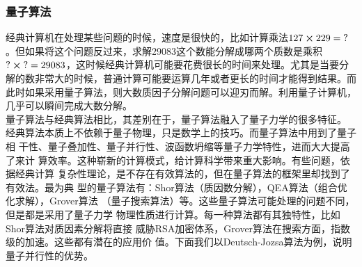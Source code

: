 \documentclass[a4paper]{article}
\begin{document}
\subsubsection{量子算法}
经典计算机在处理某些问题的时候，速度是很快的，比如计算乘法$ 127\cross 229 = \text{?} $。但如果将这个问题反过来，求解29083这个数能分解成哪两个质数是乘积$ \text{?}\cross\text{?} = 29083 $，这时候经典计算机可能要花费很长的时间来处理。尤其是当要分解的数非常大的时候，普通计算可能要运算几年或者更长的时间才能得到结果。而此时如果采用量子算法，则大数质因子分解问题可以迎刃而解。利用量子计算机，几乎可以瞬间完成大数分解。\\
量子算法与经典算法相比，其差别在于，量子算法融入了量子力学的很多特征。
经典算法本质上不依赖于量子物理，只是数学上的技巧。而量子算法中用到了量子相
干性、量子叠加性、量子并行性、波函数坍缩等量子力学特性，进而大大提高了来计
算效率。这种崭新的计算模式，给计算科学带来重大影响。有些问题，依据经典计算
复杂性理论，是不存在有效算法的，但在量子算法的框架里却找到了有效法。最为典
型的量子算法有：Shor算法（质因数分解），QEA算法（组合优化求解），Grover算法
（量子搜索算法）等。这些量子算法可能处理的问题不同，但是都是采用了量子力学
物理性质进行计算。每一种算法都有其独特性，比如Shor算法对质因素分解将直接
威胁RSA加密体系，Grover算法在搜索方面，指数级的加速。这些都有潜在的应用价
值。下面我们以Deutsch-Jozsa算法为例，说明量子并行性的优势。\\
\end{document}
